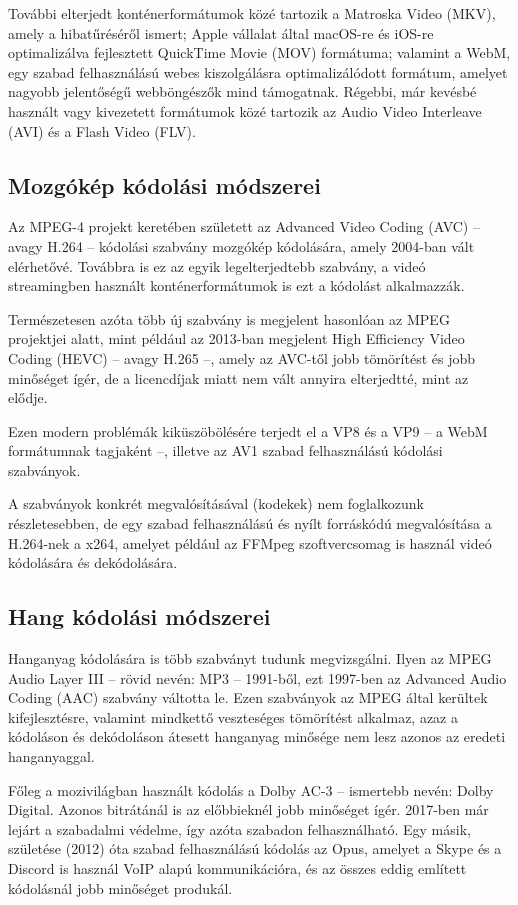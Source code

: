 További elterjedt konténerformátumok közé tartozik a Matroska Video (MKV), amely a hibatűréséről ismert; Apple vállalat által macOS-re és iOS-re optimalizálva fejlesztett QuickTime Movie (MOV) formátuma; valamint a WebM, egy szabad felhasználású webes kiszolgálásra optimalizálódott formátum, amelyet nagyobb jelentőségű webböngészők mind támogatnak. Régebbi, már kevésbé használt vagy kivezetett formátumok közé tartozik az Audio Video Interleave (AVI) és a Flash Video (FLV).

\subsection{Mozgókép kódolási módszerei}

Az MPEG-4 projekt keretében született az Advanced Video Coding (AVC) -- avagy H.264 -- kódolási szabvány mozgókép kódolására, amely 2004-ban vált elérhetővé. Továbbra is ez az egyik legelterjedtebb szabvány, a videó streamingben használt konténerformátumok is ezt a kódolást alkalmazzák.

Természetesen azóta több új szabvány is megjelent hasonlóan az MPEG projektjei alatt, mint például az 2013-ban megjelent High Efficiency Video Coding (HEVC) -- avagy H.265 --, amely az AVC-től jobb tömörítést és jobb minőséget ígér, de a licencdíjak miatt nem vált annyira elterjedtté, mint az elődje.

Ezen modern problémák kiküszöbölésére terjedt el a VP8 és a VP9 -- a WebM formátumnak tagjaként --, illetve az AV1 szabad felhasználású kódolási szabványok.

A szabványok konkrét megvalósításával (kodekek) nem foglalkozunk részletesebben, de egy szabad felhasználású és nyílt forráskódú megvalósítása a H.264-nek a x264, amelyet például az FFMpeg szoftvercsomag is használ videó kódolására és dekódolására.

\subsection{Hang kódolási módszerei}

Hanganyag kódolására is több szabványt tudunk megvizsgálni. Ilyen az MPEG Audio Layer III -- rövid nevén: MP3 -- 1991-ből, ezt 1997-ben az Advanced Audio Coding (AAC) szabvány váltotta le. Ezen szabványok az MPEG által kerültek kifejlesztésre, valamint mindkettő veszteséges tömörítést alkalmaz, azaz a kódoláson és dekódoláson átesett hanganyag minősége nem lesz azonos az eredeti hanganyaggal.

Főleg a mozivilágban használt kódolás a Dolby AC-3 -- ismertebb nevén: Dolby Digital. Azonos bitrátánál is az előbbieknél jobb minőséget ígér. 2017-ben már lejárt a szabadalmi védelme, így azóta szabadon felhasználható. Egy másik, születése (2012) óta szabad felhasználású kódolás az Opus, amelyet a Skype és a Discord is használ VoIP alapú kommunikációra, és az összes eddig említett kódolásnál jobb minőséget produkál.


